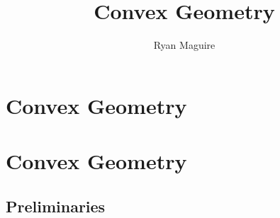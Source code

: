 \documentclass[crop=false,class=book,oneside]{standalone}
\begin{document}
    \ifx\ifmathcourses\undefined
        \title{Convex Geometry}
        \author{Ryan Maguire}
        \date{\vspace{-5ex}}
        \maketitle
        \tableofcontents
        \clearpage
        \chapter{Convex Geometry}
        \setcounter{chapter}{1}
    \else
        \chapter{Convex Geometry}
    \fi
    \section{Preliminaries}
\end{document}
